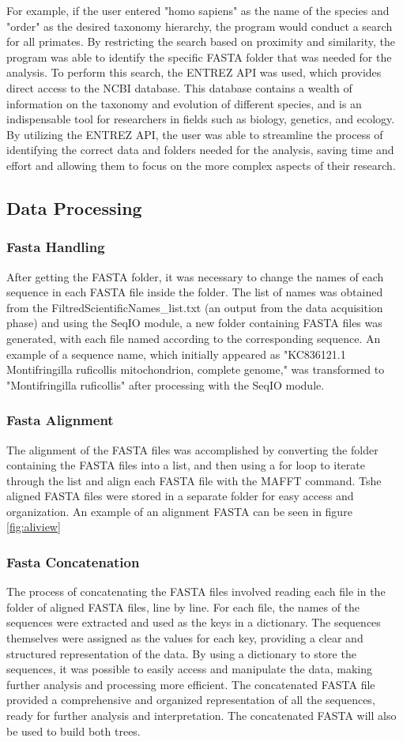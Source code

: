 \documentclass[12pt]{article}
\begin{document}
For example, if the user entered "homo sapiens" as the name of the species and "order" as the desired taxonomy hierarchy, the program would conduct a search for all primates. By restricting the search based on proximity and similarity, the program was able to identify the specific FASTA folder that was needed for the analysis.\newline
To perform this search, the ENTREZ API was used, which provides direct access to the NCBI database. This database contains a wealth of information on the taxonomy and evolution of different species, and is an indispensable tool for researchers in fields such as biology, genetics, and ecology. By utilizing the ENTREZ API, the user was able to streamline the process of identifying the correct data and folders needed for the analysis, saving time and effort and allowing them to focus on the more complex aspects of their research.
\subsection{Data Processing}
\subsubsection{Fasta Handling}
After getting the FASTA folder, it was necessary to change the names of each sequence in each FASTA file inside the folder. The list of names was obtained from the FiltredScientificNames\_list.txt (an output from the data acquisition phase) and using the SeqIO module, a new folder containing FASTA files was generated, with each file named according to the corresponding sequence. An example of a sequence name, which initially appeared as "\>KC836121.1 Montifringilla ruficollis mitochondrion, complete genome," was transformed to "Montifringilla ruficollis" after processing with the SeqIO module.
\subsubsection{Fasta Alignment}
The alignment of the FASTA files was accomplished by converting the folder containing the FASTA files into a list, and then using a for loop to iterate through the list and align each FASTA file with the MAFFT command. Tshe aligned FASTA files were stored in a separate folder for easy access and organization. An example of an alignment FASTA can be seen in figure \ref{fig:aliview}
\subsubsection{Fasta Concatenation}
The process of concatenating the FASTA files involved reading each file in the folder of aligned FASTA files, line by line. For each file, the names of the sequences were extracted and used as the keys in a dictionary. The sequences themselves were assigned as the values for each key, providing a clear and structured representation of the data.
By using a dictionary to store the sequences, it was possible to easily access and manipulate the data, making further analysis and processing more efficient. The concatenated FASTA file provided a comprehensive and organized representation of all the sequences, ready for further analysis and interpretation. The concatenated FASTA will also be used to build both trees.
\end{document}

